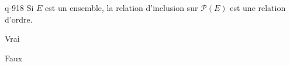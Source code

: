\begin{truefalse}{q-918}
Si $E$ est un ensemble, la relation d'inclusion sur $\mathcal P(E)$ est une relation d'ordre.
\item* Vrai
\item Faux
\end{truefalse}

